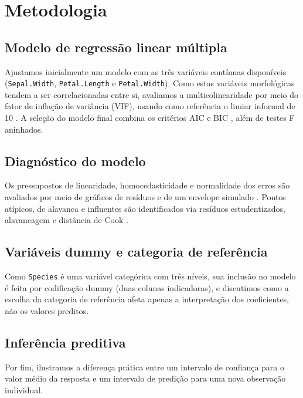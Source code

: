\documentclass[a4paper]{_extensions/modeloufcg/modeloUFCG}
\begin{document}
\section{Metodologia}\label{metodologia}

\subsection{Modelo de regressão linear
múltipla}\label{modelo-de-regressuxe3o-linear-muxfaltipla}

Ajustamos inicialmente um modelo com as três variáveis contínuas
disponíveis (\texttt{Sepal.Width}, \texttt{Petal.Length} e
\texttt{Petal.Width}). Como estas variáveis morfológicas tendem a ser
correlacionadas entre si, avaliamos a multicolinearidade por meio do
fator de inflação de variância (VIF), usando como referência o limiar
informal de 10 \citep{Kutner2004}. A seleção do modelo final combina os
critérios AIC \citep{Akaike1974} e BIC \citep{Schwarz1978}, além de
testes F aninhados.

\subsection{Diagnóstico do modelo}\label{diagnuxf3stico-do-modelo}

Os pressupostos de linearidade, homocedasticidade e normalidade dos
erros são avaliados por meio de gráficos de resíduos e de um envelope
simulado \citep{CookWeisberg1982}. Pontos atípicos, de alavanca e
influentes são identificados via resíduos estudentizados, alavancagem e
distância de Cook \citep{Cook1977}.

\subsection{Variáveis dummy e categoria de
referência}\label{variuxe1veis-dummy-e-categoria-de-referuxeancia}

Como \texttt{Species} é uma variável categórica com três níveis, sua
inclusão no modelo é feita por codificação dummy (duas colunas
indicadoras), e discutimos como a escolha da categoria de referência
afeta apenas a interpretação dos coeficientes, não os valores preditos.

\subsection{Inferência preditiva}\label{inferuxeancia-preditiva}

Por fim, ilustramos a diferença prática entre um intervalo de confiança
para o valor médio da resposta e um intervalo de predição para uma nova
observação individual.
\end{document}
